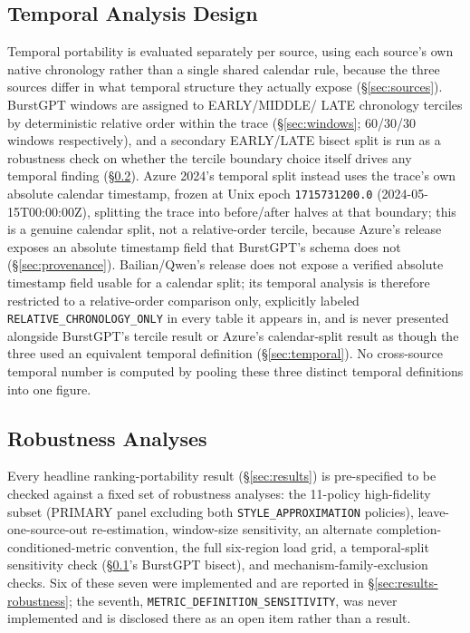 \subsection{Temporal Analysis Design}
\label{sec:temporal-design}

Temporal portability is evaluated separately per source, using each
source's own native chronology rather than a single shared calendar rule,
because the three sources differ in what temporal structure they actually
expose (\S\ref{sec:sources}). BurstGPT windows are assigned to EARLY/MIDDLE/
LATE chronology terciles by deterministic relative order within the trace
(\S\ref{sec:windows}; 60/30/30 windows respectively), and a secondary
EARLY/LATE bisect split is run as a robustness check on whether the
tercile boundary choice itself drives any temporal finding
(\S\ref{sec:robustness}). Azure 2024's temporal split instead uses the
trace's own absolute calendar timestamp, frozen at Unix epoch
\texttt{1715731200.0} (2024-05-15T00:00:00Z), splitting the trace into
before/after halves at that boundary; this is a genuine calendar split,
not a relative-order tercile, because Azure's release exposes an
absolute timestamp field that BurstGPT's schema does not
(\S\ref{sec:provenance}). Bailian/Qwen's release does not expose a
verified absolute timestamp field usable for a calendar split; its
temporal analysis is therefore restricted to a relative-order
comparison only, explicitly labeled \texttt{RELATIVE\_CHRONOLOGY\_ONLY}
in every table it appears in, and is never presented alongside BurstGPT's
tercile result or Azure's calendar-split result as though the three used
an equivalent temporal definition (\S\ref{sec:temporal}). No cross-source
temporal number is computed by pooling these three distinct temporal
definitions into one figure.

\subsection{Robustness Analyses}
\label{sec:robustness}

Every headline ranking-portability result (\S\ref{sec:results}) is
pre-specified to be checked against a fixed set of robustness analyses: the
11-policy high-fidelity subset (PRIMARY panel excluding both
\texttt{STYLE\_APPROXIMATION} policies), leave-one-source-out re-estimation,
window-size sensitivity, an alternate completion-conditioned-metric
convention, the full six-region load grid, a temporal-split sensitivity
check (\S\ref{sec:temporal-design}'s BurstGPT bisect), and
mechanism-family-exclusion checks. Six of these seven were implemented and
are reported in \S\ref{sec:results-robustness}; the seventh,
\texttt{METRIC\_DEFINITION\_SENSITIVITY}, was never implemented and is
disclosed there as an open item rather than a result.

